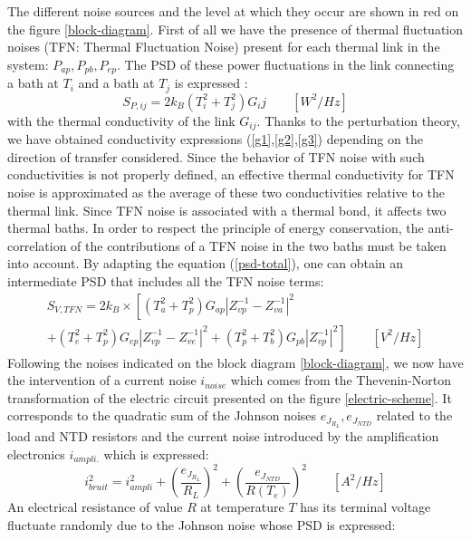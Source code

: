 The different noise sources and the level at which they occur are shown in red on the figure \ref{block-diagram}. First of all we have the presence of thermal fluctuation noises (TFN: Thermal Fluctuation Noise) present for each thermal link in the system: $P_{ap}, P_{pb}, P_{ep}$. The PSD of these power fluctuations in the link connecting a bath at $T_i$ and a bath at $T_j$ is expressed \cite{alex} \cite{ashcroft}:
\begin{equation}
S_{P,ij} = 2k_B(T_i^2 + T_j^2) G_ij \qquad [W^2/Hz]
\end{equation}
with the thermal conductivity of the link $G_{ij}$. Thanks to the perturbation theory, we have obtained conductivity expressions (\ref{g1},\ref{g2},\ref{g3}) depending on the direction of transfer considered. Since the behavior of TFN noise with such conductivities is not properly defined, an effective thermal conductivity for TFN noise is approximated as the average of these two conductivities relative to the thermal link. Since TFN noise is associated with a thermal bond, it affects two thermal baths. In order to respect the principle of energy conservation, the anti-correlation of the contributions of a TFN noise in the two baths must be taken into account. By adapting the equation (\ref{psd-total}), one can obtain an intermediate PSD that includes all the TFN noise terms:
\begin{multline}
S_{V,TFN} = 2k_B \times  \left[ (T_a^2 + T_p^2) G_{ap} \left\vert Z_{vp}^{-1} - Z_{va}^{-1} \right\vert^2 \right. \\ \left. + (T_e^2 + T_p^2) G_{ep} \left\vert Z_{vp}^{-1} - Z_{ve}^{-1} \right\vert^2 + (T_p^2 + T_b^2) G_{pb} \left\vert Z_{vp}^{-1}\right\vert^2 \right] \qquad [V^2/Hz]
\end{multline}
Following the noises indicated on the block diagram \ref{block-diagram}, we now have the intervention of a current noise $i_{noise}$ which comes from the Thevenin-Norton transformation of the electric circuit presented on the figure \ref{electric-scheme}. It corresponds to the quadratic sum of the Johnson noises $e_{J_{R_L}}, e_{J_{NTD}}$ related to the load and NTD resistors and the current noise introduced by the amplification electronics $i_{ampli.}$ which is expressed: 
\begin{equation}
\label{i-bruit}
i_{bruit}^2 = i_{ampli}^2 + \left( \frac{e_{J_{R_L}}}{R_L} \right)^2 + \left( \frac{e_{J_{NTD}}}{R(T_e)} \right)^2 \qquad [A^2/Hz]
\end{equation}
An electrical resistance of value $R$ at temperature $T$ has its terminal voltage fluctuate randomly due to the Johnson noise whose PSD is expressed:
